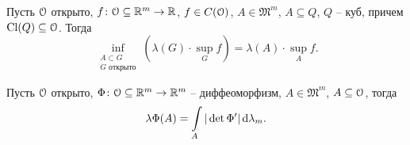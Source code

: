 \begin{lemma}
    Пусть $\mathcal{O}$ открыто, $f \colon \mathcal{O} \subseteq \mathbb{R}^m \to \mathbb{R}$, $f \in C(\mathcal{O})$, 
    $A \in \mathfrak{M}^m$, $A \subseteq Q$, $Q$ -- куб, причем $\operatorname{Cl}(Q) \subseteq \mathcal{O}$. 
    Тогда
    \[
        \inf_{\substack{A \subset G \\ G \text{ открыто}}}
        {\left(\lambda(G) \cdot \sup_{G}{f}\right)} = \lambda(A) \cdot \sup_{A}{f}
    .\] 
\end{lemma}

\begin{theorem}
    Пусть $\mathcal{O}$ открыто, $\Phi \colon \mathcal{O} \subseteq \mathbb{R}^m \to \mathbb{R}^m$ -- диффеоморфизм,
    $A \in \mathfrak{M}^m$, $A \subseteq \mathcal{O}$, тогда
    \[
        \lambda \Phi(A) = \int\limits_{A}{|\det{\Phi'}| \,\mathrm{d}\lambda_m}
    .\] 
\end{theorem}

